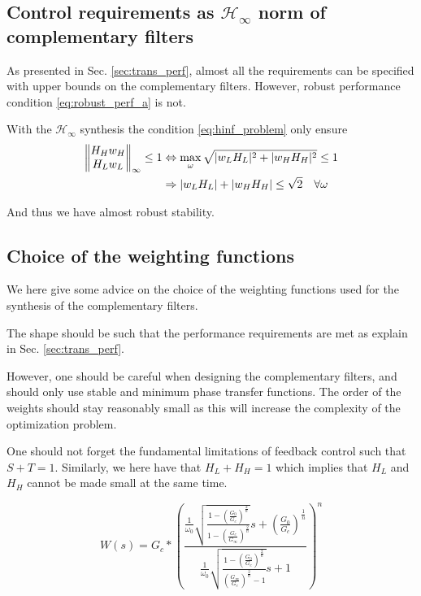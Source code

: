 \documentclass[9pt, technote, a4paper]{ieeeconf}
\begin{document}
\subsection{Control requirements as \(\mathcal{H}_\infty\) norm of complementary filters}
\label{sec:org8724b71}
As presented in Sec. \ref{sec:trans_perf}, almost all the requirements can be specified with upper bounds on the complementary filters.
However, robust performance condition \eqref{eq:robust_perf_a} is not.

With the \(\mathcal{H}_\infty\) synthesis the condition \eqref{eq:hinf_problem} only ensure
\begin{align*}
  \left\|\begin{matrix} H_H w_H \\ H_L w_L \end{matrix}\right\|_{\infty} \le 1 &\Leftrightarrow \max_\omega \sqrt{|w_L H_L|^2 + |w_H H_H|^2} \le 1\\
                                                             &\Rightarrow |w_L H_L| + |w_H H_H| \le \sqrt{2} \quad \forall\omega
\end{align*}

And thus we have almost robust stability.

\subsection{Choice of the weighting functions}
\label{sec:org04e66eb}
   \label{sec:hinf_weighting_func}
We here give some advice on the choice of the weighting functions used for the synthesis of the complementary filters.

The shape should be such that the performance requirements are met as explain in Sec. \ref{sec:trans_perf}.

However, one should be careful when designing the complementary filters, and should only use stable and minimum phase transfer functions.
The order of the weights should stay reasonably small as this will increase the complexity of the optimization problem.

One should not forget the fundamental limitations of feedback control such that \(S + T = 1\).
Similarly, we here have that \(H_L + H_H = 1\) which implies that \(H_L\) and \(H_H\) cannot be made small at the same time.

\begin{equation}
  W(s) = G_c * \left(\frac{\frac{1}{\omega_0}\sqrt{\frac{1 - \left(\frac{G_0}{G_c}\right)^{\frac{2}{n}}}{1 - \left(\frac{G_c}{G_\infty}\right)^{\frac{2}{n}}}} s + \left(\frac{G_0}{G_c}\right)^{\frac{1}{n}}}{\frac{1}{\omega_0} \sqrt{\frac{1 - \left(\frac{G_0}{G_c}\right)^{\frac{2}{n}}}{\left(\frac{G_\infty}{G_c}\right)^{\frac{2}{n}} - 1}} s + 1}\right)^n
\end{equation}
\end{document}
